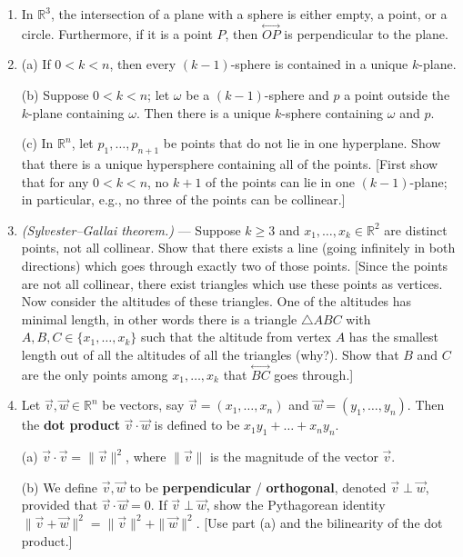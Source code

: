 \documentclass[leqno]{book}
\begin{document}
\begin{enumerate}
\item In $\mathbb R^3$, the intersection of a plane with a sphere is either empty, a point, or a circle.  Furthermore, if it is a point $P$, then $\overset{\longleftrightarrow}{OP}$ is perpendicular to the plane.

\item (a) If $0<k<n$, then every $(k-1)$-sphere is contained in a unique $k$-plane.

(b) Suppose $0<k<n$; let $\omega$ be a $(k-1)$-sphere and $p$ a point outside the $k$-plane containing $\omega$.  Then there is a unique $k$-sphere containing $\omega$ and $p$.

(c) In $\mathbb R^n$, let $p_1,\dots,p_{n+1}$ be points that do not lie in one hyperplane.  Show that there is a unique hypersphere containing all of the points.  [First show that for any $0<k<n$, no $k+1$ of the points can lie in one $(k-1)$-plane; in particular, e.g., no three of the points can be collinear.]

\item\emph{(Sylvester–Gallai theorem.)} \---- Suppose $k\geqslant 3$ and $x_1,\dots,x_k\in\mathbb R^2$ are distinct points, not all collinear.  Show that there exists a line (going infinitely in both directions) which goes through exactly two of those points.  [Since the points are not all collinear, there exist triangles which use these points as vertices.  Now consider the altitudes of these triangles.  One of the altitudes has minimal length, in other words there is a triangle $\triangle ABC$ with $A,B,C\in\{x_1,\dots,x_k\}$ such that the altitude from vertex $A$ has the smallest length out of all the altitudes of all the triangles (why?).  Show that $B$ and $C$ are the only points among $x_1,\dots,x_k$ that $\overset{\longleftrightarrow}{BC}$ goes through.]

\item Let $\vec v,\vec w\in\mathbb R^n$ be vectors, say $\vec v=(x_1,\dots,x_n)$ and $\vec w=(y_1,\dots,y_n)$.  Then the \textbf{dot product} $\vec v\cdot\vec w$ is defined to be $x_1y_1+\dots+x_ny_n$.

(a) $\vec v\cdot\vec v=\|\vec v\|^2$, where $\|\vec v\|$ is the magnitude of the vector $\vec v$.

(b) We define $\vec v,\vec w$ to be \textbf{perpendicular} / \textbf{orthogonal}, denoted $\vec v\perp\vec w$, provided that $\vec v\cdot\vec w=0$.  If $\vec v\perp\vec w$, show the Pythagorean identity $\|\vec v+\vec w\|^2=\|\vec v\|^2+\|\vec w\|^2$.  [Use part (a) and the bilinearity of the dot product.]


\end{enumerate}
\end{document}
